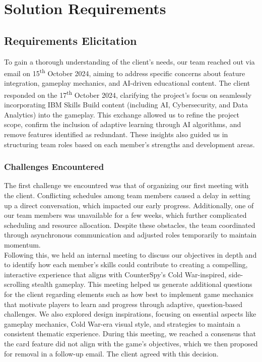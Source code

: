 \documentclass[11pt, a4paper]{article}
\begin{document}
\newpage

\section{Solution Requirements}

\subsection{Requirements Elicitation}

\noindent To gain a thorough understanding of the client’s needs, our team reached out via email on 15\textsuperscript{th} October 2024, aiming to address specific concerns about feature integration, gameplay mechanics, and AI-driven educational content. The client responded on the 17\textsuperscript{th} October 2024, clarifying the project’s focus on seamlessly incorporating IBM Skills Build content (including AI, Cybersecurity, and Data Analytics) into the gameplay. This exchange allowed us to refine the project scope, confirm the inclusion of adaptive learning through AI algorithms, and remove features identified as redundant. These insights also guided us in structuring team roles based on each member’s strengths and development areas.

\subsubsection{Challenges Encountered}

\noindent The first challenge we encountred was that of organizing our first
meeting with the client. Conflicting schedules among team members caused a delay
in setting up a direct conversation, which impacted our early progress.
Additionally, one of our team members was unavailable for a few weeks, which
further complicated scheduling and resource allocation. Despite these obstacles,
the team coordinated through asynchronous communication and adjusted roles
temporarily to maintain momentum. \\

\noindent Following this, we held an internal meeting to discuss our objectives in depth and to identify how each member’s skills could contribute to creating a compelling, interactive experience that aligns with CounterSpy’s Cold War-inspired, side-scrolling stealth gameplay. This meeting helped us generate additional questions for the client regarding elements such as how best to implement game mechanics that motivate players to learn and progress through adaptive, question-based challenges. We also explored design inspirations, focusing on essential aspects like gameplay mechanics, Cold War-era visual style, and strategies to maintain a consistent thematic experience. During this meeting, we reached a consensus that the card feature did not align with the game’s objectives, which we then proposed for removal in a follow-up email. The client agreed with this decision.
\end{document}
